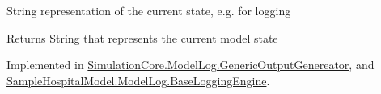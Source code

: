 String representation of the current state, e.\+g. for logging 

\begin{DoxyReturn}{Returns}
String that represents the current model state
\end{DoxyReturn}


Implemented in \hyperlink{class_simulation_core_1_1_model_log_1_1_generic_output_genereator_aebbfb494fb7c5ebadfc71cdf7e33e6fd}{Simulation\+Core.\+Model\+Log.\+Generic\+Output\+Genereator}, and \hyperlink{class_sample_hospital_model_1_1_model_log_1_1_base_logging_engine_a42d583d084c412154271ebf0cd593696}{Sample\+Hospital\+Model.\+Model\+Log.\+Base\+Logging\+Engine}.

